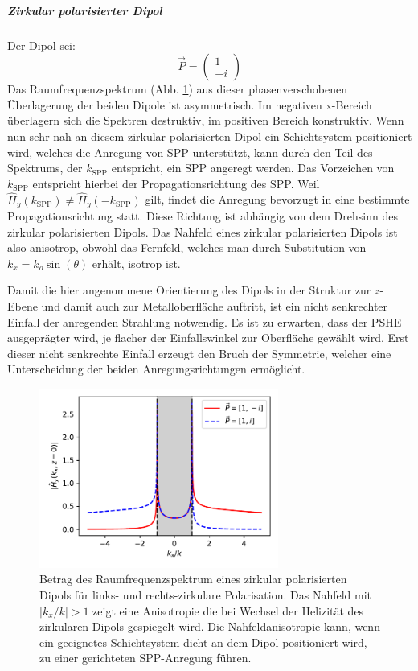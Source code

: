 \documentclass[titlepage,  ngerman]{article}
\begin{document}
	\subparagraph{Zirkular polarisierter Dipol}
	Der Dipol sei:
	$$\vec{P} = \begin{pmatrix} 1 \\ -i\end{pmatrix}$$
	Das Raumfrequenzspektrum (Abb. \ref{fig:spatial_spectrum_circ}) aus dieser phasenverschobenen Überlagerung der beiden Dipole ist asymmetrisch.  Im negativen x-Bereich überlagern sich die Spektren destruktiv, im positiven Bereich konstruktiv. Wenn nun sehr nah an diesem zirkular polarisierten Dipol ein Schichtsystem positioniert wird, welches die Anregung von SPP unterstützt, kann durch den Teil des Spektrums, der $k_{\mathrm{SPP}}$ entspricht, ein SPP angeregt werden. Das Vorzeichen von $k_{\mathrm{SPP}}$ entspricht hierbei der Propagationsrichtung des SPP. Weil $\hat{H}_y(k_{\mathrm{SPP}}) \neq \hat{H}_y( -k_{\mathrm{SPP}}) $ gilt, findet die Anregung bevorzugt in eine bestimmte Propagationsrichtung statt. Diese Richtung ist abhängig von dem Drehsinn des zirkular polarisierten Dipols.			
	Das Nahfeld eines zirkular polarisierten Dipols ist also anisotrop, obwohl das Fernfeld, welches man durch Substitution von $k_x = k_o \sin(\theta)$ erhält, isotrop ist.
	
	Damit die hier angenommene Orientierung des Dipols in der Struktur zur $z$-Ebene und damit auch zur Metalloberfläche auftritt, ist ein nicht senkrechter Einfall der anregenden Strahlung notwendig. Es ist zu erwarten, dass der PSHE ausgeprägter wird, je flacher der Einfallswinkel zur Oberfläche gewählt wird. Erst dieser nicht senkrechte Einfall erzeugt den Bruch der Symmetrie, welcher eine Unterscheidung der beiden Anregungsrichtungen ermöglicht.
	\begin{figure}[h]
		\centering
		\includegraphics[width=0.7\textwidth]{figures/spatial_spectrum_circ.pdf}
		\caption[Raumfrequenzspektrum zirkular polarisierter Dipol]{Betrag des Raumfrequenzspektrum eines zirkular polarisierten Dipols für links- und rechts-zirkulare Polarisation. Das Nahfeld mit $|k_x/k| >1$ zeigt eine Anisotropie die bei Wechsel der Helizität des zirkularen Dipols gespiegelt wird. Die Nahfeldanisotropie kann, wenn ein geeignetes Schichtsystem dicht an dem Dipol positioniert wird, zu einer gerichteten SPP-Anregung führen.}
		\label{fig:spatial_spectrum_circ}
	\end{figure}	
	
\end{document}
